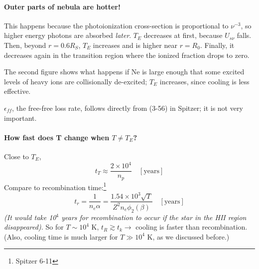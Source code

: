 \documentclass[12pt]{article}
\newcommand{\mar}[1]{\hspace{0pt}\marginpar{-\textcolor{black}{#1}-}}
\newcommand{\mynotes}[1]{{\fontfamily{cmss}\selectfont \textit{#1}}}
\begin{document}
\paragraph{Outer parts of nebula are hotter!}
\mar{158}This happens because the photoionization cross-section is
proportional to $\nu^{-3}$, so higher energy photons are absorbed
\emph{later}. $T_{E}$ decreases at first, because $U_{s\nu}$ falls.
Then, beyond $r = 0.6R_{S}$, $T_{E}$ increases and is higher near
$r = R_{0}$. Finally, it decreases again in the transition region
where the ionized fraction drops to zero.

The second figure shows what happens if Ne is large enough that some
excited levels of heavy ions are collisionally de-excited;
$T_{E}$ increases, since cooling is less effective.

$\epsilon_{ff}$, the free-free loss rate, follows directly from
(3-56) in Spitzer; it is not very important.

\paragraph{How fast does T change when $T \neq T_{E}$?}
Close to $T_{E}$,
\[
    t_{T} \approx \frac{2\times10^{4}}{n_{p}} \quad [\mathrm{years}]
    \]
Compare to recombination time:\footnote{Spitzer 6-11}
\[
    t_{r} = \frac{1}{n_{e}\alpha}
    = \frac{1.54\times10^{3}\sqrt{T}}{Z^{2}n_{e}\phi_{2}(\beta)}
    \quad [\mathrm{years}]
    \]
\mynotes{(It would take 10$^{4}$ years for recombination to occur if
the star in the HII region disappeared).}
So for $T \sim 10^{4}$ K, $t_{R} \gtrsim t_{k} \rightarrow$
cooling is faster than recombination. (Also, cooling time is much larger
for $T \gg 10^{4}$ K, as we discussed before.)
\end{document}
